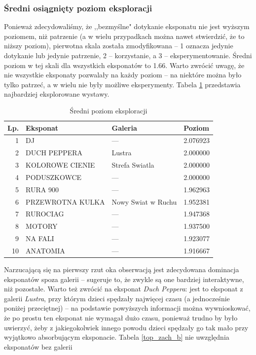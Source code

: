 \documentclass[conference]{IEEEtran}
\begin{document}
\subsubsection{Średni osiągnięty poziom eksploracji}
Ponieważ zdecydowaliśmy, że ,,bezmyślne" dotykanie eksponatu nie jest wyższym poziomem, niż patrzenie (a w wielu przypadkach można nawet stwierdzić, że to niższy poziom), pierwotna skala została zmodyfikowana -- 1 oznacza jedynie dotykanie lub jedynie patrzenie, 2 -- korzystanie, a 3 -- eksperymentowanie. Średni poziom w tej skali dla wszystkich eksponatów to 1.66. Warto zwrócić uwagę, że nie wszystkie eksponaty pozwalały na każdy poziom -- na niektóre można było tylko patrzeć, a w wielu nie były możliwe eksperymenty. Tabela \ref{top_zach} przedstawia najbardziej eksplorowane wystawy.
\begin{table}[H]
\caption{Średni poziom eksploracji}
\label{top_zach}
\centering
\begin{tabular}{|r|l|l|l|}
\hline
\textbf{Lp.} & \textbf{Eksponat} & \textbf{Galeria} & \textbf{Poziom} \\
\hline
1  &                DJ &             ---        &     2.076923    \\
2  &      DUCH PEPPERA &             Lustra     &        2.000000 \\
3  &   KOLOROWE CIENIE &     Strefa Swiatla     &        2.000000 \\
4  &       PODUSZKOWCE &             ---        &     2.000000    \\
5  &          RURA 900 &             ---        &     1.962963    \\
6  &  PRZEWROTNA KULKA & Nowy Swiat w Ruchu     &        1.952381 \\
7  &          RUROCIAG &             ---        &     1.947368    \\
8  &            MOTORY &             ---        &     1.937500    \\
9  &           NA FALI &             ---        &     1.923077    \\
10 &          ANATOMIA &             ---        &     1.916667    \\
\hline
\end{tabular}
\end{table}
Narzucającą się na pierwszy rzut oka obserwacją jest zdecydowana dominacja eksponatów spoza galerii -- sugeruje to, że zwykle są one bardziej interaktywne, niż pozostałe. Warto też zwrócić na eksponat \textit{Duch Peppera}: jest to eksponat z galerii \textit{Lustra}, przy którym dzieci spędzały najwięcej czasu (a jednocześnie poniżej przeciętnej) -- na podstawie powyższych informacji można wywnioskować, że po prostu ten eksponat nie wymagał dużo czasu, ponieważ trudno by było uwierzyć, żeby z jakiegokolwiek innego powodu dzieci spędzały go tak mało przy wyjątkowo absorbującym eksponacie.
Tabela \ref{top_zach_b} nie uwzględnia eksponatów bez galerii 
\end{document}
